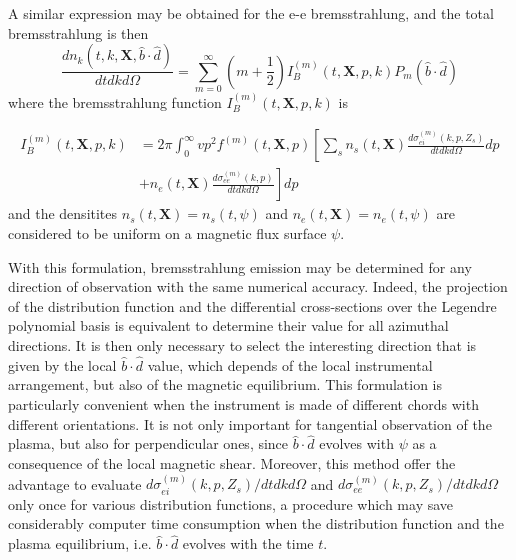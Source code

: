 A similar expression may be obtained for the e-e bremsstrahlung, and the
total bremsstrahlung is then
\begin{equation}
\frac{dn_{k}\left( t,k,\mathbf{X},\widehat{b}\cdot \widehat{d}\right) }{dtdkd%
\Omega }=\sum_{m=0}^{\infty }\left( m+\frac{1}{2}\right) I_{B}^{\left(
m\right) }\left( t,\mathbf{X},p,k\right) P_{m}\left( \widehat{b}\cdot
\widehat{d}\right)   \label{bremLegendre}
\end{equation}
where the bremsstrahlung function $I_{B}^{\left( m\right) }\left( t,\mathbf{X%
},p,k\right) $ is

\begin{align}
I_{B}^{\left( m\right) }\left( t,\mathbf{X},p,k\right) & =2\pi\int
_{0}^{\infty}vp^{2}f^{\left( m\right) }\left( t,\mathbf{X},p\right) \left[
\sum_{s}n_{s}\left( t,\mathbf{X}\right) \frac{d\sigma_{ei}^{\left( m\right)
}\left( k,p,Z_{s}\right) }{dtdkd\Omega}\right. dp  \nonumber \\
& \left. +n_{e}\left( t,\mathbf{X}\right) \frac{d\sigma_{ee}^{\left(
m\right) }\left( k,p\right) }{dtdkd\Omega}\right] dp
\end{align}
and the densitites $n_{s}\left( t,\mathbf{X}\right) =n_{s}\left(
t,\psi\right) $ and $n_{e}\left( t,\mathbf{X}\right) =n_{e}\left(
t,\psi\right) $ are considered to be uniform on a magnetic flux surface $%
\psi $.

With this formulation, bremsstrahlung emission may be determined for any
direction of observation with the same numerical accuracy. Indeed, the
projection of the distribution function and the differential cross-sections
over the Legendre polynomial basis is equivalent to determine their value
for all azimuthal directions. It is then only necessary to select the
interesting direction that is given by the local $\widehat{b}\cdot\widehat{d}
$ value, which depends of the local instrumental arrangement, but also of
the magnetic equilibrium. This formulation is particularly convenient when
the instrument is made of different chords with different orientations. It
is not only important for tangential observation of the plasma, but also for
perpendicular ones, since $\widehat{b}\cdot\widehat{d}$ evolves with $\psi$
as a consequence of the local magnetic shear. Moreover, this method offer
the advantage to evaluate $d\sigma_{ei}^{\left( m\right) }\left(
k,p,Z_{s}\right) /dtdkd\Omega$ and $d\sigma_{ee}^{\left( m\right) }\left(
k,p,Z_{s}\right) /dtdkd\Omega$ only once for various distribution functions,
a procedure which may save considerably computer time consumption when the
distribution function and the plasma equilibrium, i.e. $\widehat{b}\cdot%
\widehat{d}$ evolves with the time $t$.

